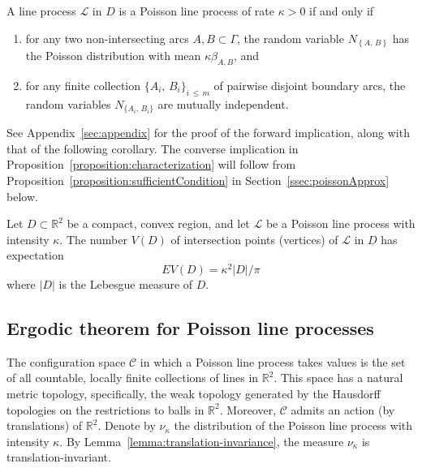 \documentclass[AHL, Unicode, longabstracts, published]{cedram}
\newcommand{\xset}[1]{\left\{ #1 \right\}}
\newcommand{\zz}[1]{\mathbb #1}
\newcommand*{\romanenumi}{\renewcommand*{\theenumi}{\roman{enumi}}}
\begin{document}
\goodbreak
\begin{prop}\label{proposition:characterization}
A line process $\mathcal{L}$ in $D$ is a Poisson line process of rate $\kappa >0$ if and only if
\begin{enumerate}\romanenumi
\item \label{list2.5.1}for any two non-intersecting arcs $A,B \subset \Gamma$, the random variable $N_{\xset {A,\,B}}$ has the Poisson distribution with mean $\kappa \beta_{A,B}$, and
\item \label{list2.5.2}for any finite collection $\{A_{i},\,B_{i} \}_{i\,\leq\,m}$ of pairwise disjoint boundary arcs, the random variables $N_{\{A_{i},\,B_{i}\}}$ are mutually independent.
\end{enumerate}
\end{prop}

See Appendix~\ref{sec:appendix} for the proof of the forward implication, along with that of the following corollary. The converse implication in Proposition~\ref{proposition:characterization} will follow from Proposition~\ref{proposition:sufficientCondition} in Section~\ref{ssec:poissonApprox} below.


\begin{coro}\label{corollary:ppIntensity}
Let $D\subset \zz{R}^{2}$ be a compact, convex region, and let $\mathcal{L}$ be a Poisson line process with intensity $\kappa$. The number $V(D)$ of intersection points (vertices) of $\mathcal{L}$ in $D$ has expectation
\[
EV (D)=\kappa^{2} |D|/\pi
\]
where $|D|$ is the Lebesgue measure of $D$.
\end{coro}



\subsection{Ergodic theorem for Poisson line processes}\label{ssec:erg-theorem-plp}

The configuration space $\mathcal{C}$ in which a Poisson line process takes values is the set of all countable, locally finite collections of lines in $\zz{R}^{2}$. This space has a natural metric topology, specifically, the weak topology generated by the Hausdorff topologies on the restrictions to balls in $\zz{R}^{2}$. Moreover, $\mathcal{C}$ admits an action (by translations) of $\zz{R}^{2}$. Denote by $\nu_{\kappa}$ the distribution of the Poisson line process with intensity $\kappa$. By Lemma~\ref{lemma:translation-invariance}, the measure $\nu_{\kappa}$ is translation-invariant.
\end{document}
